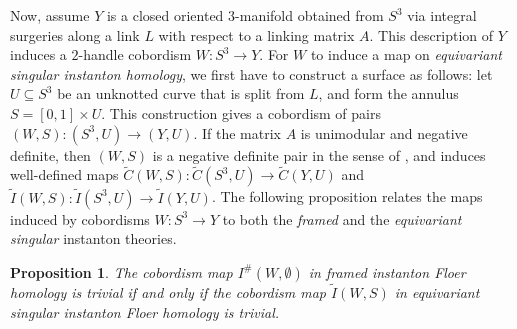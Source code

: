 \documentclass[11pt]{amsart}
\newtheorem{proposition}[theorem]{Proposition}
\begin{document}
Now, assume $Y$ is a closed oriented $3$-manifold obtained from $S^3$ via integral surgeries along a link $L$ with respect to a linking matrix $A$. This description of $Y$ induces a $2$-handle cobordism $W:S^3\to Y$. For $W$ to induce a map on \emph{equivariant singular instanton homology}, we first have to construct a surface as follows: let $U\subseteq S^3$ be an unknotted curve that is split from $L$, and form the annulus $S=[0,1]\times U$. This construction gives a cobordism of pairs $(W,S): (S^3,U)\to (Y,U)$. If the matrix $A$ is unimodular and negative definite, then $(W,S)$ is a negative definite pair in the sense of \cite[Definition 2.33]{DS-singular}, and induces well-defined maps $\widetilde{C}(W, S) \colon \widetilde{C}(S^3, U) \to \widetilde{C}(Y, U)$ and $\tilde{I}(W, S) \colon \tilde{I}(S^3, U) \to \tilde{I}(Y, U)$. The following proposition relates the maps induced by cobordisms $W:S^3\to Y$ to both the \emph{framed} and the \emph{equivariant singular} instanton theories. 

\begin{proposition}\label{sharp-tilde} The cobordism map $I^{\#}(W,\emptyset)$ in framed instanton Floer homology is trivial if and only if the cobordism map $\widetilde{I}(W, S)$ in equivariant singular instanton Floer homology is trivial.
\end{proposition}
\end{document}
